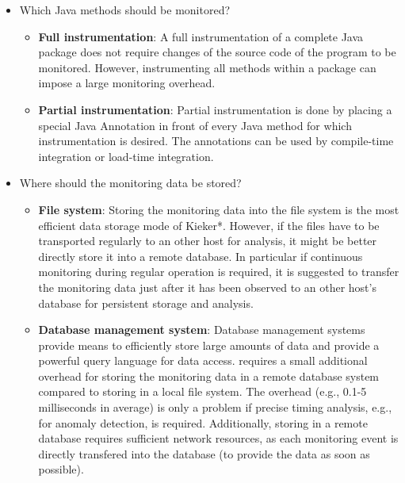 \documentclass[a4paper,12pt]{scrartcl}
\begin{document}
\begin{itemize}
\begin{itemize}
\end{itemize}
\item Which Java methods should be monitored?
\begin{itemize}
\item \textbf{Full instrumentation}: A full instrumentation of a complete Java package does not require changes of the source code of the program to be monitored. However, instrumenting all methods within a package can impose a large monitoring overhead.
\item \textbf{Partial instrumentation}: Partial instrumentation is done by placing a special Java Annotation in front of every Java method for which instrumentation is desired. The annotations can be used by compile-time integration or load-time integration.
\end{itemize}
\item Where should the monitoring data be stored?
\begin{itemize}
\item \textbf{File system}: Storing the monitoring data into the file system is the most efficient data storage mode of Kieker*. However, if the files have to be transported regularly to an other host for analysis, it might be better directly store it into a remote database. In particular if continuous monitoring during regular operation is required, it is suggested to transfer the monitoring data just after it has been observed to an other host's database for persistent storage and analysis.
\item \textbf{Database management system}: Database management systems provide means to efficiently store large amounts of data and provide a powerful query language for data access. \tpmon{} requires a small additional overhead for storing the monitoring data in a remote database system compared to storing in a local file system. The overhead (e.g., 0.1-5 milliseconds in average) is only a problem if precise timing analysis, e.g., for anomaly detection, is required. Additionally, storing in a remote database requires sufficient network resources, as each monitoring event is directly transfered into the database (to provide the data as soon as possible). %
\end{itemize}
\end{itemize}
\end{document}
